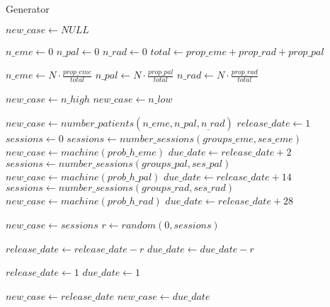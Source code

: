 \begin{algorithm}
\caption{Generator}
\begin{algorithmic}[1]

\State $new\_case \gets NULL$

\State $n\_eme \gets 0$
\State $n\_pal \gets 0$
\State $n\_rad \gets 0$
\State $total \gets prop\_eme + prop\_rad + prop\_pal$

\State $n\_eme \gets N \cdot \frac{prop\_eme}{total}$
\State $n\_pal \gets N \cdot \frac{prop\_pal}{total}$
\State $n\_rad \gets N \cdot \frac{prop\_rad}{total}$

\State $new\_case \gets n\_high$
\State $new\_case \gets n\_low$

\State $new\_case \gets number\_patients(n\_eme, n\_pal, n_\_rad)$
	\State $release\_date \gets 1$
	\State $sessions \gets 0$
		\State $sessions \gets number\_sessions(groups\_eme, ses\_eme)$
		\State $new\_case \gets machine(prob\_h\_eme)$
		\State $due\_date \gets release\_date + 2$
		\State $sessions \gets number\_sessions(groups\_pal, ses\_pal)$
		\State $new\_case \gets machine(prob\_h\_pal)$
		\State $due\_date \gets release\_date + 14$
	\Else
		\State $sessions \gets number\_sessions(groups\_rad, ses\_rad)$
		\State $new\_case \gets machine(prob\_h\_rad)$
		\State $due\_date \gets release\_date + 28$
	\EndIf
	
	\State $new\_case \gets sessions$
	\State $r \gets random(0, sessions)$
	
	\State $release\_date \gets release\_date - r$
	\State $due\_date \gets due\_date - r$
	
		\State $release\_date \gets 1$
		\State $due\_date \gets 1$
	\EndIf
	
	\State $new\_case \gets release\_date$
	\State $new\_case \gets due\_date$
\EndFor

\EndProcedure
\end{algorithmic}
\end{algorithm}